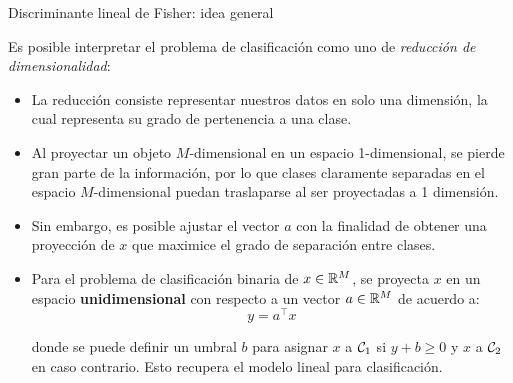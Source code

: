 \documentclass[9pt]{beamer}
\begin{document}
\begin{frame}{Discriminante lineal de Fisher: idea general}
	
Es posible interpretar el problema de clasificación como uno de \emph{reducción de dimensionalidad}: \pause

\begin{itemize}
	\item La reducción consiste representar nuestros datos  en solo una dimensión, la cual representa su grado de pertenencia a una clase. \pause
	\item Al proyectar un objeto $M$-dimensional en un espacio  1-dimensional, se pierde gran parte de la información, por lo que clases claramente separadas en el espacio $M$-dimensional puedan traslaparse al ser proyectadas a 1 dimensión.\pause
	\item Sin embargo, es posible ajustar el vector $a$ con la finalidad de obtener una proyección de $x$ que maximice el grado de separación entre clases.\pause
	\item Para el problema de clasificación binaria de $x\in \mathbb{R}^M$, se proyecta $x$ en un espacio \textbf{unidimensional} con respecto a un vector $a\in\mathbb{R}^M$ de acuerdo a:
\begin{equation*}
	y = a^\top x
\end{equation*}

donde se puede definir un umbral $b$ para asignar $x$ a ${\mathcal C}_1$ si $y+b\geq 0$ y $x$ a ${\mathcal C}_2$ en caso contrario. Esto recupera el modelo lineal para clasificación.
\end{itemize}
	
\end{frame}
\end{document}
